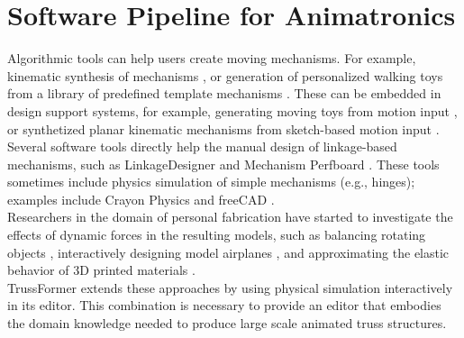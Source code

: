 \section{Software Pipeline for Animatronics}
Algorithmic tools can help users create moving mechanisms. For example, kinematic synthesis of mechanisms \cite{subramanian:1995}, or generation of personalized walking toys from a library of predefined template mechanisms \cite{bharaj:2015}. These can be embedded in design support systems, for example, generating moving toys from motion input \cite{zhu:2012}, or synthetized planar kinematic mechanisms from sketch-based motion input \cite{coros:2013}.\\
Several software tools directly help the manual design of linkage-based mechanisms, such as LinkageDesigner \cite{linkage} and Mechanism Perfboard \cite{jeong:2018}. These tools sometimes include physics simulation of simple mechanisms (e.g., hinges); examples include Crayon Physics \cite{crayon} and freeCAD \cite{freeCAD}.\\
Researchers in the domain of personal fabrication have started to investigate the effects of dynamic forces in the resulting models, such as balancing rotating objects \cite{prevost:2013}, interactively designing model airplanes \cite{umetani:2014}, and approximating the elastic behavior of 3D printed materials \cite{chen:2017}.\\
TrussFormer extends these approaches by using physical simulation interactively in its editor. This combination is necessary to provide an editor that embodies the domain knowledge needed to produce large scale animated truss structures.
